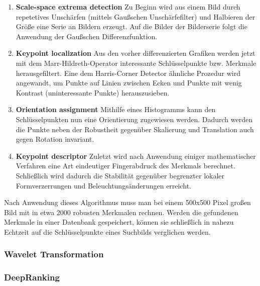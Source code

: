 \documentclass[a4paper,12pt]{article}
\begin{document}
\begin{enumerate}
    \item \textbf{Scale-space extrema detection}\newline
    Zu Beginn wird aus einem Bild durch repetetives Unschärfen (mittels
    Gaußschen Unschärfefilter) und Halbieren der Größe eine Serie an Bildern
    erzeugt. Auf die Bilder der Bilderserie folgt die Anwendung der Gaußschen
    Differenzfunktion.
    \item \textbf{Keypoint localization}\newline
    Aus den vorher differenzierten Grafiken werden jetzt mit dem
    Marr-Hildreth-Operator interessante Schlüsselpunkte bzw. Merkmale 
    herausgefiltert. Eine dem Harris-Corner Detector ähnliche Prozedur wird
    angewandt, um Punkte auf Linien zwischen Ecken und Punkte mit wenig
    Kontrast (uninteressante Punkte) herauszusieben.
    \item \textbf{Orientation assignment}\newline
    Mithilfe eines Histogramms kann den Schlüsselpunkten nun eine Orientierung
    zugewiesen werden. Dadurch werden die Punkte neben der Robustheit gegenüber
    Skalierung und Translation auch gegen Rotation invariant.
    \item \textbf{Keypoint descriptor}\newline
    Zuletzt wird nach Anwendung einiger mathematischer Verfahren eine Art
    eindeutiger Fingerabdruck des Merkmals berechnet. Schließlich wird dadurch
    die Stabilität gegenüber begrenzter lokaler Formverzerrungen und
    Beleuchtungsänderungen erreicht.
\end{enumerate}

Nach Anwendung dieses Algorithmus muss man bei einem 500x500 Pixel großen Bild
mit in etwa 2000 robusten Merkmalen rechnen. Werden die gefundenen Merkmale in
einer Datenbank gespeichert, können sie schließlich in nahezu Echtzeit auf die
Schlüsselpunkte eines Suchbilds verglichen werden.

\subsubsection{Wavelet Transformation}
\subsubsection{DeepRanking}

\newpage


\newpage

\newpage


\newpage

\end{document}
